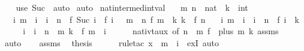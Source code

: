 \begin{isabellebody}
\ \ \isamarkupfalse%
\ {\isacharparenleft}{\kern0pt}use\ Suc\ \ auto{\isacharparenright}{\kern0pt}\isanewline
{}\isamarkupfalse%
\ auto%
\endisatagproof
{\isafoldproof}%
%
\isadelimproof
\isanewline
%
\endisadelimproof
\isanewline
{}\isamarkupfalse%
\ nat{\isacharunderscore}{\kern0pt}intermed{\isacharunderscore}{\kern0pt}int{\isacharunderscore}{\kern0pt}val{\isacharcolon}{\kern0pt}\isanewline
\ \ \ m\ n\ {\isacharcolon}{\kern0pt}{\isacharcolon}{\kern0pt}\ nat\ \ k\ {\isacharcolon}{\kern0pt}{\isacharcolon}{\kern0pt}\ int\isanewline
\ \ \ {\isachardoublequoteopen}{\isasymforall}i{\isachardot}{\kern0pt}\ m\ {\isasymle}\ i\ {\isasymand}\ i\ {\isacharless}{\kern0pt}\ n\ {\isasymlongrightarrow}\ {\isasymbar}f\ {\isacharparenleft}{\kern0pt}Suc\ i{\isacharparenright}{\kern0pt}\ {\isacharminus}{\kern0pt}\ f\ i{\isasymbar}\ {\isasymle}\ {}{\isachardoublequoteclose}\ {\isachardoublequoteopen}m\ {\isasymle}\ n{\isachardoublequoteclose}\ {\isachardoublequoteopen}f\ m\ {\isasymle}\ k{\isachardoublequoteclose}\ {\isachardoublequoteopen}k\ {\isasymle}\ f\ n{\isachardoublequoteclose}\isanewline
\ \ \ {\isachardoublequoteopen}{\isasymexists}i{\isachardot}{\kern0pt}\ m\ {\isasymle}\ i\ {\isasymand}\ i\ {\isasymle}\ n\ {\isasymand}\ f\ i\ {\isacharequal}{\kern0pt}\ k{\isachardoublequoteclose}\isanewline
%
\isadelimproof
%
\endisadelimproof
%
\isatagproof
{}\isamarkupfalse%
\ {\isacharminus}{\kern0pt}\isanewline
\ \ \isamarkupfalse%
\ i\ \ {\isachardoublequoteopen}i\ {\isasymle}\ n\ {\isacharminus}{\kern0pt}\ m{\isachardoublequoteclose}\ {\isachardoublequoteopen}k\ {\isacharequal}{\kern0pt}\ f\ {\isacharparenleft}{\kern0pt}m\ {\isacharplus}{\kern0pt}\ i{\isacharparenright}{\kern0pt}{\isachardoublequoteclose}\isanewline
\ \ \ \ \isamarkupfalse%
\ nat{\isacharunderscore}{\kern0pt}ivt{\isacharunderscore}{\kern0pt}aux\ {\isacharbrackleft}{\kern0pt}of\ {\isachardoublequoteopen}n\ {\isacharminus}{\kern0pt}\ m{\isachardoublequoteclose}\ {\isachardoublequoteopen}f\ {\isasymcirc}\ plus\ m{\isachardoublequoteclose}\ k{\isacharbrackright}{\kern0pt}\ assms\ \isamarkupfalse%
\ auto\isanewline
\ \ \isamarkupfalse%
\ assms\ \isamarkupfalse%
\ {\isacharquery}{\kern0pt}thesis\isanewline
\ \ \ \ \isamarkupfalse%
\ {\isacharparenleft}{\kern0pt}rule{\isacharunderscore}{\kern0pt}tac\ x\ {\isacharequal}{\kern0pt}\ {\isachardoublequoteopen}m\ {\isacharplus}{\kern0pt}\ i{\isachardoublequoteclose}\ \ exI{\isacharparenright}{\kern0pt}\ auto\isanewline

\end{isabellebody}
